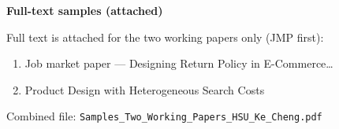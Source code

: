 \documentclass[11pt]{article}
\begin{document}
\vspace{0.55em}
{\large\bfseries Full-text samples (attached)}

\noindent
Full text is attached for the two working papers only (JMP first):

\begin{enumerate}[leftmargin=*, itemsep=0.35em]
\item Job market paper --- Designing Return Policy in E-Commerce\ldots
\item Product Design with Heterogeneous Search Costs
\end{enumerate}

\noindent Combined file: \texttt{Samples\_Two\_Working\_Papers\_HSU\_Ke\_Cheng.pdf}
\end{document}
